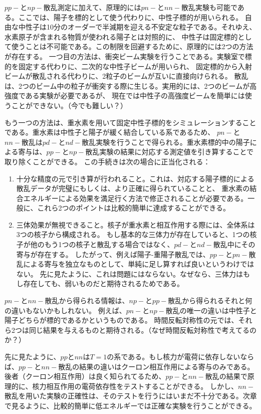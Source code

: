 \documentclass[a4paper,11pt,uplatex]{jsarticle}
\begin{document}
$pp-$と$np-$散乱測定に加えて、原理的には$pn-$と$nn-$散乱実験も可能である。ここでは、陽子を標的として使う代わりに、中性子標的が用いられる。
自由な中性子は10分のオーダーで半減期を迎える不安定な粒子である。それゆえ、水素原子が含まれる物質が使われる陽子とは対照的に、
中性子は固定標的として使うことは不可能である。この制限を回避するために、原理的には2つの方法が存在する。
一つ目の方法は、衝突ビーム実験を行うことである。実験室で標的を固定する代わりに、二次的な中性子ビームが用いられ、
固定標的から入射ビームが散乱される代わりに、2粒子のビームが互いに直接向けられる。
散乱は、2つのビーム中の粒子が衝突する際に生じる。実用的には、2つのビームが高強度である実験が必要であるが、
現在では中性子の高強度ビームを簡単には使うことができない。（今でも難しい？）

もう一つの方法は、重水素を用いて固定中性子標的をシミュレーションすることである。重水素は中性子と陽子が緩く結合している系であるため、
$pn-$と$nn-$散乱は$pd-$と$nd-$散乱実験を行うことで得られる。重水素標的中の陽子による寄与は、$pp-$と$np-$散乱実験の結果に対応する測定値を引き算することで取り除くことができる。
この手続きは次の場合に正当化される：
\begin{enumerate}
  \item 十分な精度の元で引き算が行われること。これは、対応する陽子標的による散乱データが完璧にもしくは、より正確に得られていることと、
        重水素の結合エネルギーによる効果を満足行く方法で修正されることが必要である。一般に、これら2つのポイントは比較的簡単に達成することができる。

  \item 三体効果が無視できること。核子が重水素と相互作用する際には、全体系は3つの核子から構成される。
        もし基本的な三体力が存在していると、1つの核子が他のもう1つの核子と散乱する場合ではなく、$pd-$と$nd-$散乱中にその寄与が存在する。
        したがって、例えば陽子-重陽子散乱では、$pp-$と$pn-$散乱による寄与を独立なものとして、単純に足し算すれば良いというわけではない。
        先に見たように、これは問題にはならない。なぜなら、三体力はもし存在しても、弱いものだと期待されるためである。
\end{enumerate}

$pn-$と$nn-$散乱から得られる情報は、$np-$と$pp-$散乱から得られるそれと何の違いもないかもしれない。
例えば、$pn-$と$np-$散乱の唯一の違いは中性子と陽子どちらが標的であるかというものである。
時間反転対称性の元では、それら2つは同じ結果を与えるものと期待される。（なぜ時間反転対称性で考えてるのか？）

先に見たように、$pp$と$nn$は$T=1$の系である。もし核力が電荷に依存しないならば、$pp-$と$nn-$散乱の結果の違いはクーロン相互作用による寄与のみである。
後者（クーロン相互作用）は良く知られてるため、$pp-$と$nn-$散乱の結果で原理的に、核力相互作用の電荷依存性をテストすることができる。
しかし、$nn-$散乱を用いた実験の正確性は、そのテストを行うにはいまだ不十分である。次章で見るように、比較的簡単に低エネルギーでは正確な実験を行うことができる。
\end{document}
